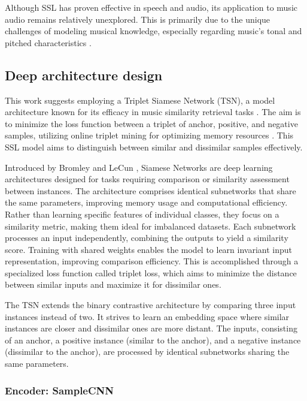 Although SSL has proven effective in speech and audio, its application to music audio remains relatively unexplored. This is primarily due to the unique challenges of modeling musical knowledge, especially regarding music's tonal and pitched characteristics \cite{Li2023MERT:Training}.

\subsection{Deep architecture design}

This work suggests employing a Triplet Siamese Network (TSN), a model architecture known for its efficacy in music similarity retrieval tasks \cite{contentmusicsimtriplet2020}. The aim is to minimize the loss function between a triplet of anchor, positive, and negative samples, utilizing online triplet mining for optimizing memory resources \cite{Sikaroudi2020OfflinePatches}. This SSL model aims to distinguish between similar and dissimilar samples effectively.

Introduced by Bromley and LeCun \cite{Bromley1993SignatureNetwork}, Siamese Networks are deep learning architectures designed for tasks requiring comparison or similarity assessment between instances. The architecture comprises identical subnetworks that share the same parameters, improving memory usage and computational efficiency. Rather than learning specific features of individual classes, they focus on a similarity metric, making them ideal for imbalanced datasets. Each subnetwork processes an input independently, combining the outputs to yield a similarity score. Training with shared weights enables the model to learn invariant input representation, improving comparison efficiency. This is accomplished through a specialized loss function called triplet loss, which aims to minimize the distance between similar inputs and maximize it for dissimilar ones.

The TSN extends the binary contrastive architecture by comparing three input instances instead of two. It strives to learn an embedding space where similar instances are closer and dissimilar ones are more distant. The inputs, consisting of an anchor, a positive instance (similar to the anchor), and a negative instance (dissimilar to the anchor), are processed by identical subnetworks sharing the same parameters.

\subsubsection{Encoder: SampleCNN}

